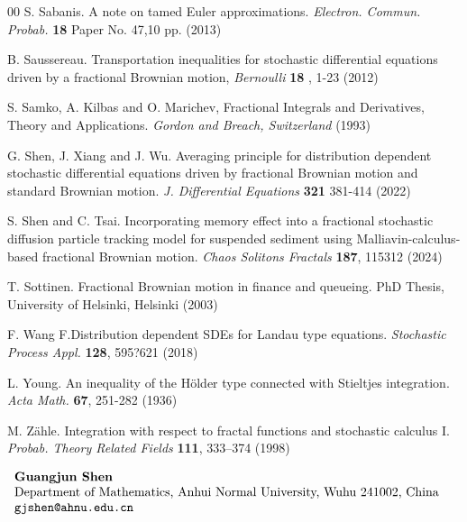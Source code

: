 \documentclass[12pt]{article}
\numberwithin{equation}{section}
\begin{document}
\begin{thebibliography}{00}
	 S. Sabanis. A note on tamed Euler approximations. {\it Electron. Commun. Probab.} {\bf 18} Paper No. 47,10 pp. (2013)
	
	 B. Saussereau. Transportation inequalities for stochastic differential equations driven
	by a fractional Brownian motion, \textit{Bernoulli} {\bf 18} , 1-23 (2012)
	
	 S. Samko, A. Kilbas and O. Marichev, Fractional Integrals and Derivatives, Theory and Applications. {\it Gordon and Breach, Switzerland} (1993)
	
	 G. Shen, J. Xiang and J. Wu. Averaging principle for distribution dependent stochastic differential equations driven by fractional Brownian motion and standard Brownian motion. {\it J. Differential Equations} {\bf 321} 381-414 (2022)
	
	S. Shen and C. Tsai. Incorporating memory effect into a fractional stochastic
	diffusion particle tracking model for suspended sediment using
	{M}alliavin-calculus-based fractional {B}rownian motion. {\it Chaos Solitons Fractals} {\bf 187}, 115312 (2024)
	
	T.  Sottinen. Fractional {B}rownian motion in finance and queueing. PhD Thesis,
	University of Helsinki, Helsinki (2003)
	
	 F. Wang F.Distribution dependent SDEs for Landau type equations. {\it Stochastic Process Appl.} {\bf 128}, 595?621 (2018)
	
	 L. Young.  An inequality of the H\"{o}lder type connected with Stieltjes integration. \textit{Acta Math.} {\bf 67},  251-282 (1936)
	
	 M. Z\"{a}hle. Integration with respect to fractal functions and stochastic calculus I. \textit{Probab. Theory Related Fields} {\bf 111}, 333--374 (1998)
	
\end{thebibliography}
\bigskip
		
		
		
		
		

$\begin{array}{cc}
			\begin{minipage}[t]{1\textwidth}
				{\bf Guangjun Shen}\\
				Department of Mathematics, Anhui Normal University, Wuhu 241002, China\\
				\texttt{gjshen@ahnu.edu.cn}
			\end{minipage}
			\hfill
		\end{array}$
\end{document}

